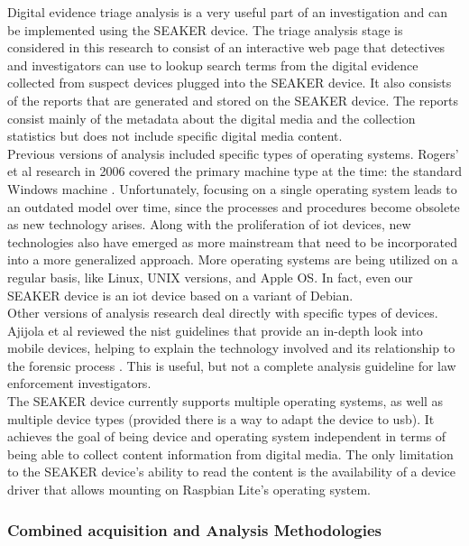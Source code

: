 \documentclass[12pt]{article}
\begin{document}
Digital evidence triage analysis is a very useful part of an investigation and can be 
implemented using the SEAKER device.  The triage analysis stage is considered in this research
to consist of an interactive web page that detectives and investigators can use to 
lookup search terms from the digital evidence collected from suspect devices plugged into the
SEAKER device.  It also consists of the reports that are generated and stored on the
SEAKER device.  The reports consist mainly of the metadata about the digital media and the
collection statistics but does not include specific digital media content.\\

Previous versions of analysis included specific types of operating systems.
Rogers' et al research in 2006 covered the primary machine type at the time: the standard
Windows machine \cite{rogers2006computer}.  Unfortunately, focusing on a single operating system
leads to an outdated model over time, since the processes and procedures become obsolete as
new technology arises.  Along with the proliferation of \gls{iot} devices, new technologies
also have emerged as more mainstream that need to be incorporated into a more generalized
approach.  More operating systems are being utilized on a regular basis, like Linux, UNIX
versions, and Apple OS.  In fact, even our SEAKER device is an \gls{iot} device based on a
variant of Debian.\\

Other versions of analysis research deal directly with specific types of devices.
Ajijola et al reviewed the \gls{nist} guidelines that provide an in-depth
look into mobile devices, helping to explain the technology involved and its
relationship to the forensic process \cite{ajijola2014review}. This is useful, but not a complete analysis
guideline for law enforcement investigators.\\

The SEAKER device currently supports multiple operating systems, as well as multiple
device types (provided there is a way to adapt the device to \gls{usb}). It achieves the goal of
being device and operating system independent in terms of being able to collect content
information from digital media. The only limitation to the SEAKER device's ability
to read the content is the availability of a device driver that allows mounting on Raspbian
Lite's operating system.\\

\subsubsection{Combined acquisition and Analysis Methodologies}
\end{document}
